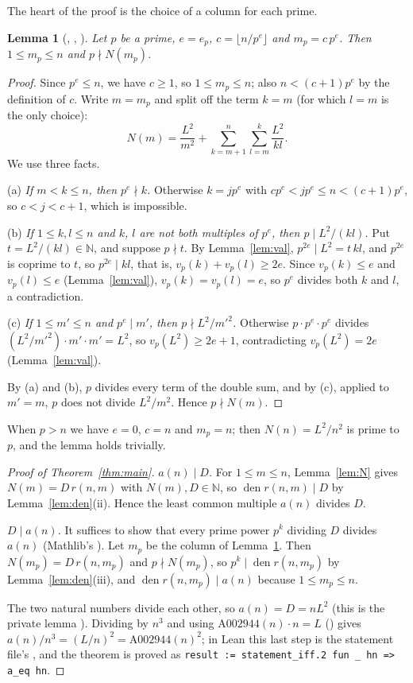 \documentclass[11pt]{amsart}
\theoremstyle{plain}
\newtheorem{lemma}[theorem]{Lemma}
\theoremstyle{definition}
\newcommand{\N}{\mathbb{N}}
\DeclareMathOperator{\den}{den}
\begin{document}
The heart of the proof is the choice of a column for each prime.

\begin{lemma}[, , ]\label{lem:column}
Let $p$ be a prime, $e=e_p$, $c=\lfloor n/p^e\rfloor$ and $m_p=c\,p^e$. Then $1\le m_p\le n$ and $p\nmid N(m_p)$.
\end{lemma}

\begin{proof}
Since $p^e\le n$, we have $c\ge1$, so $1\le m_p\le n$; also $n<(c+1)p^e$ by the definition of $c$. Write $m=m_p$ and split off the term $k=m$ (for which $l=m$ is the only choice):
\[
  N(m)=\frac{L^2}{m^2}+\sum_{k=m+1}^n\sum_{l=m}^k\frac{L^2}{kl}.
\]
We use three facts.

(a) \emph{If $m<k\le n$, then $p^e\nmid k$.} Otherwise $k=jp^e$ with $cp^e<jp^e\le n<(c+1)p^e$, so $c<j<c+1$, which is impossible.

(b) \emph{If $1\le k,l\le n$ and $k$, $l$ are not both multiples of $p^e$, then $p\mid L^2/(kl)$.} Put $t=L^2/(kl)\in\N$, and suppose $p\nmid t$. By Lemma~\ref{lem:val}, $p^{2e}\mid L^2=t\,kl$, and $p^{2e}$ is coprime to $t$, so $p^{2e}\mid kl$, that is, $v_p(k)+v_p(l)\ge2e$. Since $v_p(k)\le e$ and $v_p(l)\le e$ (Lemma~\ref{lem:val}), $v_p(k)=v_p(l)=e$, so $p^e$ divides both $k$ and $l$, a contradiction.

(c) \emph{If $1\le m'\le n$ and $p^e\mid m'$, then $p\nmid L^2/m'^2$.} Otherwise $p\cdot p^e\cdot p^e$ divides $(L^2/m'^2)\cdot m'\cdot m'=L^2$, so $v_p(L^2)\ge2e+1$, contradicting $v_p(L^2)=2e$ (Lemma~\ref{lem:val}).

By (a) and (b), $p$ divides every term of the double sum, and by (c), applied to $m'=m$, $p$ does not divide $L^2/m^2$. Hence $p\nmid N(m)$.
\end{proof}

When $p>n$ we have $e=0$, $c=n$ and $m_p=n$; then $N(n)=L^2/n^2$ is prime to $p$, and the lemma holds trivially.

\begin{proof}[Proof of Theorem~\ref{thm:main}]
\emph{$a(n)\mid D$.} For $1\le m\le n$, Lemma~\ref{lem:N} gives $N(m)=D\,r(n,m)$ with $N(m),D\in\N$, so $\den r(n,m)\mid D$ by Lemma~\ref{lem:den}(ii). Hence the least common multiple $a(n)$ divides $D$.

\emph{$D\mid a(n)$.} It suffices to show that every prime power $p^k$ dividing $D$ divides $a(n)$ (Mathlib's ). Let $m_p$ be the column of Lemma~\ref{lem:column}. Then $N(m_p)=D\,r(n,m_p)$ and $p\nmid N(m_p)$, so $p^k\mid\den r(n,m_p)$ by Lemma~\ref{lem:den}(iii), and $\den r(n,m_p)\mid a(n)$ because $1\le m_p\le n$.

The two natural numbers divide each other, so $a(n)=D=nL^2$ (this is the private lemma ). Dividing by $n^3$ and using $\mathrm{A002944}(n)\cdot n=L$ () gives $a(n)/n^3=(L/n)^2=\mathrm{A002944}(n)^2$; in Lean this last step is the statement file's , and the theorem is proved as \lstinline|result := statement_iff.2 fun _ hn => a_eq hn|.
\end{proof}
\end{document}
